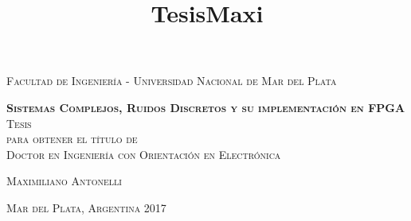 

\title{TesisMaxi} %

\begin{titlepage}

\begin{center}
	
\textsc{\Large Facultad de Ingeniería - Universidad Nacional de Mar del Plata}\\[4em]

\vspace{4em}

\textsc{ \Huge \textbf{Sistemas Complejos, Ruidos Discretos y su implementación en FPGA}}\\[4em]

\textsc{\large Tesis}\\[3em]

\textsc{para obtener el título de}\\[1em]

\textsc{\Large Doctor en Ingeniería con Orientación en Electrónica}\\[1em]

\vspace{4em}

\textsc{\Large Maximiliano Antonelli}\\[1em]

\end{center}

\vfill

\textsc{Mar del Plata, Argentina \hspace*{\fill} 2017}

\end{titlepage}